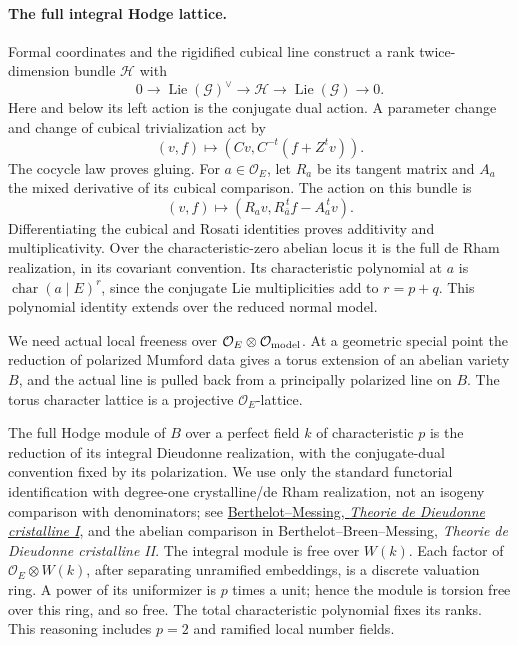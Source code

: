 \paragraph{The full integral Hodge lattice.}
Formal coordinates and the rigidified cubical line construct
a rank twice-dimension bundle \(\mathcal H\) with
\[
 0\to\operatorname{Lie}(\mathcal G)^\vee
         \to\mathcal H\to\operatorname{Lie}(\mathcal G)\to0 .
 \tag{FD20}
\]
Here and below its left action is the conjugate dual action.
A parameter change and change of cubical trivialization act by
\[
                  (v,f)\longmapsto(Cv,C^{-t}(f+Z^tv)).
 \tag{FD21}
\]
The cocycle law proves gluing.
For \(a\in\mathcal O_E\), let \(R_a\) be its tangent matrix
and \(A_a\) the mixed derivative of its cubical comparison.
The action on this bundle is
\[
                 (v,f)\longmapsto
                     (R_av,R_{\bar a}^{\,t}f-A_a^{\,t}v).
 \tag{FD22}
\]
Differentiating the cubical and Rosati identities proves
additivity and multiplicativity.
Over the characteristic-zero abelian locus it is the full
de Rham realization, in its covariant convention.
Its characteristic polynomial at \(a\) is
\(\operatorname{char}(a\mid E)^r\), since the conjugate
Lie multiplicities add to \(r=p+q\).
This polynomial identity extends over the reduced normal model.

We need actual local freeness over
\(\mathcal O_E\otimes\mathcal O_{\rm model}\).
At a geometric special point the reduction of polarized
Mumford data gives a torus extension of an abelian variety
\(B\), and the actual line is pulled back from a principally
polarized line on \(B\).
The torus character lattice is a projective
\(\mathcal O_E\)-lattice.

The full Hodge module of \(B\) over a perfect field \(k\)
of characteristic \(p\) is the reduction of its integral
Dieudonne realization, with the conjugate-dual convention
fixed by its polarization.
We use only the standard functorial identification with
degree-one crystalline/de Rham realization, not an isogeny
comparison with denominators; see
\href{https://numdam.org/book-part/AST_1979__63__17_0/}
{Berthelot--Messing, \emph{Theorie de Dieudonne cristalline I}},
and the abelian comparison in Berthelot--Breen--Messing,
\emph{Theorie de Dieudonne cristalline II}.
The integral module is free over \(W(k)\).
Each factor of \(\mathcal O_E\otimes W(k)\), after separating
unramified embeddings, is a discrete valuation ring.
A power of its uniformizer is \(p\) times a unit; hence the
module is torsion free over this ring, and so free.
The total characteristic polynomial fixes its ranks.
This reasoning includes \(p=2\) and ramified local number fields.

